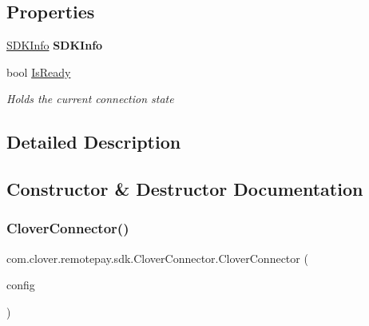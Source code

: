 \subsection*{Properties}
\begin{DoxyCompactItemize}
\item 
\mbox{\label{classcom_1_1clover_1_1remotepay_1_1sdk_1_1_clover_connector_ac4da6669fef5eb8611e92c7b77a19e2a}} 
\hyperlink{classcom_1_1clover_1_1remotepay_1_1sdk_1_1_s_d_k_info}{S\+D\+K\+Info} {\bfseries S\+D\+K\+Info}
\item 
bool \hyperlink{classcom_1_1clover_1_1remotepay_1_1sdk_1_1_clover_connector_ad73c9809998af8cc9f8f61d8b4ec4e7b}{Is\+Ready}
\begin{DoxyCompactList}\small\item\em Holds the current connection state \end{DoxyCompactList}\end{DoxyCompactItemize}


\subsection{Detailed Description}




\subsection{Constructor \& Destructor Documentation}
\mbox{\label{classcom_1_1clover_1_1remotepay_1_1sdk_1_1_clover_connector_acc9fab2e3c5832509009d8c40a8eefe8}} 
\subsubsection{\texorpdfstring{Clover\+Connector()}{CloverConnector()}}
{\footnotesize\ttfamily com.\+clover.\+remotepay.\+sdk.\+Clover\+Connector.\+Clover\+Connector (\begin{DoxyParamCaption}\item[{Clover\+Device\+Configuration}]{config }\end{DoxyParamCaption})}



